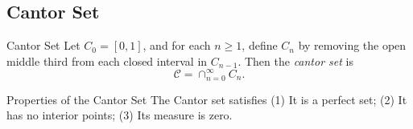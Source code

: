 \subsection{Cantor Set}

\begin{definition}{Cantor Set}{}
  Let $C_0 = [0, 1]$, and for each $n \geq 1$, define $C_n$ by removing the open
  middle third from each closed interval in $C_{n-1}$.
  Then the \emph{cantor set} is
  \begin{equation}
    \mathcal{C} = \cap _{n = 0}^{\infty}C_n.
  \end{equation}
\end{definition}

\begin{proposition}{Properties of the Cantor Set}{}
  The Cantor set satisfies
  (1) It is a perfect set;
  (2) It has no interior points;
  (3) Its measure is zero.
\end{proposition}


